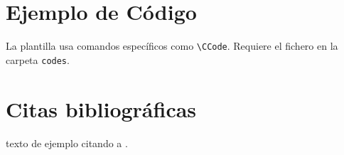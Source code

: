 \section{Ejemplo de Código}
La plantilla usa comandos específicos como \texttt{\textbackslash CCode}. Requiere el fichero en la carpeta \texttt{codes}.


\section{Citas bibliográficas}
texto de ejemplo citando a \cite{ejemplo2026}.